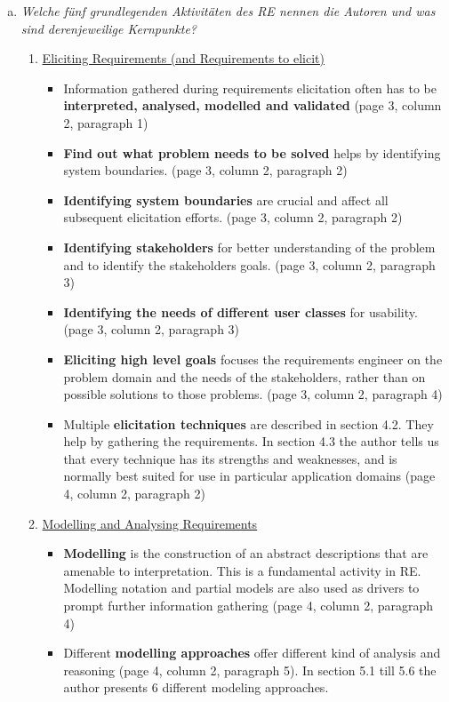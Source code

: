 \begin{enumerate}[a)]
\newpage    
    \item {\itshape Welche fünf grundlegenden Aktivitäten des RE nennen die Autoren und was sind derenjeweilige Kernpunkte?}
    \begin{enumerate}[1]
        \item \underline{Eliciting Requirements (and Requirements to elicit)}
        \begin{itemize}
            \item Information gathered during requirements elicitation often has to be \textbf{interpreted, analysed, modelled and validated} (page 3, column 2, paragraph 1)
            \item \textbf{Find out what problem needs to be solved} helps by identifying system boundaries. (page 3, column 2, paragraph 2)
            \item \textbf{Identifying system boundaries} are crucial and affect all subsequent elicitation efforts. (page 3, column 2, paragraph 2)
            \item \textbf{Identifying stakeholders} for better understanding of the problem and to identify the stakeholders goals. (page 3, column 2, paragraph 3)
            \item \textbf{Identifying the needs of different user classes} for usability. (page 3, column 2, paragraph 3)
            \item \textbf{Eliciting high level goals} focuses the requirements engineer on the problem domain and the needs of the stakeholders, rather than on possible solutions to those problems. (page 3, column 2, paragraph 4)
            \item Multiple \textbf{elicitation techniques} are described in section 4.2. They help by gathering the requirements. In section 4.3 the author tells us that every technique has its strengths and weaknesses, and is normally best suited for use in particular application domains (page 4, column 2, paragraph 2)
        \end{itemize}
        
        \item \underline{Modelling and Analysing Requirements}
        \begin{itemize}
            \item \textbf{Modelling} is the construction of an abstract descriptions that are amenable to interpretation. This is a fundamental activity in RE. Modelling notation and partial models are also used as drivers to prompt further information gathering (page 4, column 2, paragraph 4)
            \item Different \textbf{modelling approaches} offer different kind of analysis and reasoning (page 4, column 2, paragraph 5). In section 5.1 till 5.6 the author presents 6 different modeling approaches.
        \end{itemize}
        

\end{enumerate}
\end{enumerate}
